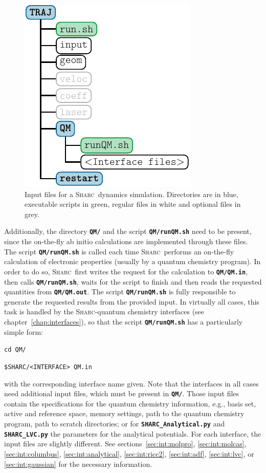 \documentclass[a4paper,10pt,DIV=15,openany,twoside=false]{scrbook}
\newcommand{\sharc}{\textsc{Sharc}}
\newcommand{\ttt}[1]{\textbf{\texttt{#1}}}
\newenvironment{example}{
  \setlength{\OuterFrameSep}{3pt}
  \vspace{0mm}
  \definecolor{shadecolor}{HTML}{E4F4FF}
  \begin{shaded}
}{
  \end{shaded}
}
\begin{document}
\begin{figure}[htb]
  \centering
  \includegraphics[scale=1]{img/dir_traj/dir_traj.pdf}
  \caption{Input files for a \sharc\ dynamics simulation. Directories are in blue, executable scripts in green, regular files in white and optional files in grey.}
  \label{fig:dir_traj}
\end{figure}

Additionally, the directory \ttt{QM/} and the script \ttt{QM/runQM.sh} need to be present, since the on-the-fly ab initio calculations are implemented through these files. The script \ttt{QM/runQM.sh} is called each time \sharc\ performs an on-the-fly calculation of electronic properties (usually by a quantum chemistry program). In order to do so, \sharc\ first writes the request for the calculation to \ttt{QM/QM.in}, then calls \ttt{QM/runQM.sh}, waits for the script to finish and then reads the requested quantities from \ttt{QM/QM.out}. The script \ttt{QM/runQM.sh} is fully responsible to generate the requested results from the provided input. 
In virtually all cases, this task is handled by the \sharc-quantum chemistry interfaces (see chapter~\ref{chap:interfaces}), so that the script \ttt{QM/runQM.sh} has a particularly simple form:
\begin{example}
\verb|cd QM/|

\verb|$SHARC/<INTERFACE> QM.in |
\end{example}
with the corresponding interface name given. Note that the interfaces in all cases need additional input files, which must be present in \ttt{QM/}. Those input files contain the specifications for the quantum chemistry information, e.g., basis set, active and reference space, memory settings, path to the quantum chemistry program, path to scratch directories; or for \ttt{SHARC\_Analytical.py} and \ttt{SHARC\_LVC.py} the parameters for the analytical potentials. For each interface, the input files are slightly different. See sections~\ref{sec:int:molpro}, \ref{sec:int:molcas}, \ref{sec:int:columbus}, \ref{sec:int:analytical}, \ref{sec:int:ricc2}, \ref{sec:int:adf}, \ref{sec:int:lvc}, or \ref{sec:int:gaussian} for the necessary information.
\end{document}
